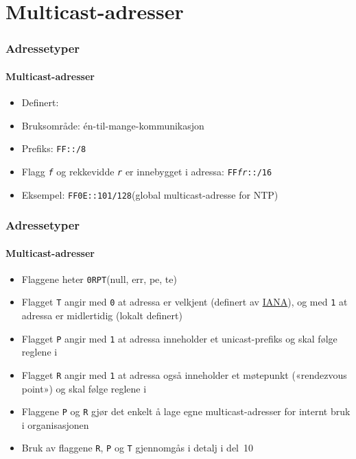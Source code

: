\section{Multicast-adresser}
\begin{frame}%
  \frametitle{Adressetyper}
  \framesubtitle{Multicast-adresser}
  \pause
  \begin{itemize}[<+->]
  \item Definert: 
  \item Bruksområde: én-til-mange-kommunikasjon
  \item Prefiks: \texttt{FF::/8}
  \item Flagg \texttt{\textit{f\/}} og rekkevidde
    \texttt{\textit{r\/}} er innebygget i adressa:
    \texttt{FF\textit{fr}::/16}
  \item Eksempel: \texttt{FF0E::101/128}\hfill(global multicast-adresse
    for NTP)
  \end{itemize}
\end{frame}

\begin{frame}%
  \frametitle{Adressetyper}
  \framesubtitle{Multicast-adresser}
  \begin{itemize}[<+->]
  \item Flaggene heter \texttt{0RPT}\hfill(null, err, pe, te)
  \item Flagget \texttt{T} angir med \texttt{0} at adressa er velkjent
    (definert av \href{http://www.iana.org/}{IANA}), og med \texttt{1}
    at adressa er midlertidig (lokalt definert)
  \item Flagget \texttt{P} angir med \texttt{1} at adressa inneholder
    et unicast-prefiks og skal følge reglene i 
  \item Flagget \texttt{R} angir med \texttt{1} at adressa også
    inneholder et møtepunkt («rendezvous point») og skal følge reglene
    i 
  \item Flaggene \texttt{P} og \texttt{R} gjør det enkelt å lage egne
    multicast-adresser for internt bruk i organisasjonen
  \item Bruk av flaggene \texttt{R}, \texttt{P} og \texttt{T}
    gjennomgås i detalj i del~10
  \end{itemize}
\end{frame}

